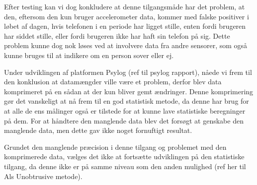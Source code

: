 Efter testing kan vi dog konkludere at denne tilgangsmåde har det problem, at den, eftersom den kun bruger accelerometer data, kommer med falske positiver i løbet af dagen, hvis telefonen i en periode har ligget stille, enten fordi brugeren har siddet stille, eller fordi brugeren ikke har haft sin telefon på sig.
Dette problem kunne dog nok løses ved at involvere data fra andre sensorer, som også kunne bruges til at indikere om en person sover eller ej. 

Under udviklingen af platformen Psylog (ref til psylog rapport), nåede vi frem til den konklusion at datamængder ville være et problem, derfor blev data komprimeret på en sådan at der kun bliver gemt ændringer.
Denne komprimering gør det vanskeligt at nå frem til en god statistisk metode, da denne har brug for at alle de ens målinger også er tilstede for at kunne lave statistiske beregninger på dem.
For at håndtere den manglende data blev det forsøgt at genskabe den manglende data, men dette gav ikke noget fornuftigt resultat.

Grundet den manglende præcision i denne tilgang og problemet med den komprimerede data, vælges det ikke at fortsætte udviklingen på den statistiske tilgang, da denne ikke er på samme niveau som den anden mulighed (ref her til Als Unobtrusive metode).